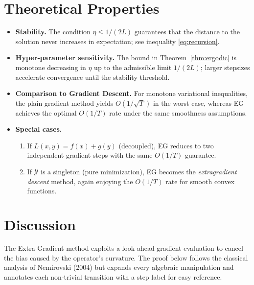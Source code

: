 \documentclass{article}
\begin{document}
\section*{Theoretical Properties}
\begin{itemize}[leftmargin=*]
\item \textbf{Stability.} The condition $\eta\le 1/(2L)$ guarantees that the distance to the solution never increases in expectation; see inequality \eqref{eq:recursion}.
\item \textbf{Hyper‑parameter sensitivity.} The bound in Theorem~\ref{thm:ergodic} is monotone decreasing in $\eta$ up to the admissible limit $1/(2L)$; larger stepsizes accelerate convergence until the stability threshold.
\item \textbf{Comparison to Gradient Descent.} For monotone variational inequalities, the plain gradient method yields $O(1/\sqrt{T})$ in the worst case, whereas EG achieves the optimal $O(1/T)$ rate under the same smoothness assumptions.
\item \textbf{Special cases.}
    \begin{enumerate}
        \item If $L(x,y)=f(x)+g(y)$ (decoupled), EG reduces to two independent gradient steps with the same $O(1/T)$ guarantee.
        \item If $\mathcal Y$ is a singleton (pure minimization), EG becomes the \emph{extragradient descent} method, again enjoying the $O(1/T)$ rate for smooth convex functions.
    \end{enumerate}
\end{itemize}

\section*{Discussion}
The Extra‑Gradient method exploits a look‑ahead gradient evaluation to cancel the bias caused by the operator’s curvature. The proof below follows the classical analysis of Nemirovski (2004) but expands every algebraic manipulation and annotates each non‑trivial transition with a step label for easy reference.

\newpage
\end{document}
